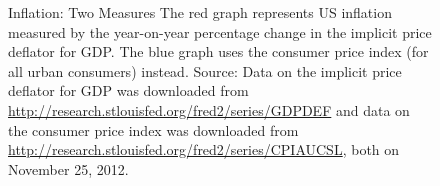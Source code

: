 \documentclass[
  letterpaper,
]{book}
\begin{document}
\begin{figure}


\caption{\label{fig-inflation}Inflation: Two Measures The red graph
represents US inflation measured by the year-on-year percentage change
in the implicit price deflator for GDP. The blue graph uses the consumer
price index (for all urban consumers) instead. Source: Data on the
implicit price deflator for GDP was downloaded from
\url{http://research.stlouisfed.org/fred2/series/GDPDEF} and data on the
consumer price index was downloaded from
\url{http://research.stlouisfed.org/fred2/series/CPIAUCSL}, both on
November 25, 2012.}

\end{figure}%
\end{document}
